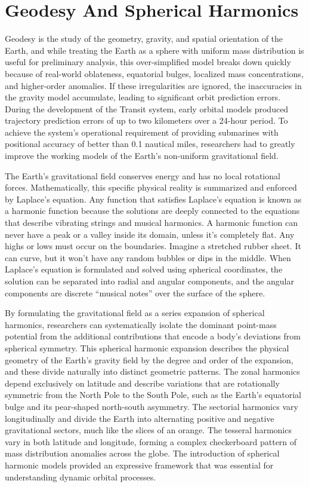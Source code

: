 \section{Geodesy And Spherical Harmonics}

Geodesy is the study of the geometry, gravity, and spatial orientation of the Earth, and while treating the Earth as a sphere with uniform mass distribution is useful for preliminary analysis, this over-simplified model breaks down quickly because of real-world oblateness, equatorial bulges, localized mass concentrations, and higher-order anomalies. If these irregularities are ignored, the inaccuracies in the gravity model accumulate, leading to significant orbit prediction errors. During the development of the Transit system, early orbital models produced trajectory prediction errors of up to two kilometers over a 24-hour period. To achieve the system's operational requirement of providing submarines with positional accuracy of better than 0.1 nautical miles, researchers had to greatly improve the working models of the Earth's non-uniform gravitational field.

The Earth’s gravitational field conserves energy and has no local rotational forces. Mathematically, this specific physical reality is summarized and enforced by Laplace's equation. Any function that satisfies Laplace's equation is known as a harmonic function because the solutions are deeply connected to the equations that describe vibrating strings and musical harmonics. A harmonic function can never have a peak or a valley inside its domain, unless it's completely flat. Any highs or lows must occur on the boundaries. Imagine a stretched rubber sheet. It can curve, but it won't have any random bubbles or dips in the middle. When Laplace's equation is formulated and solved using spherical coordinates, the solution can be separated into radial and angular components, and the angular components are discrete “musical notes” over the surface of the sphere.

By formulating the gravitational field as a series expansion of spherical harmonics, researchers can systematically isolate the dominant point-mass potential from the additional contributions that encode a body's deviations from spherical symmetry. This spherical harmonic expansion describes the physical geometry of the Earth's gravity field by the degree and order of the expansion, and these divide naturally into distinct geometric patterns. The zonal harmonics depend exclusively on latitude and describe variations that are rotationally symmetric from the North Pole to the South Pole, such as the Earth's equatorial bulge and its pear-shaped north-south asymmetry. The sectorial harmonics vary longitudinally and divide the Earth into alternating positive and negative gravitational sectors, much like the slices of an orange. The tesseral harmonics vary in both latitude and longitude, forming a complex checkerboard pattern of mass distribution anomalies across the globe. The introduction of spherical harmonic models provided an expressive framework that was essential for understanding dynamic orbital processes.

